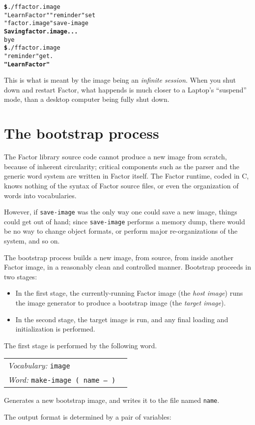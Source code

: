 \documentclass{book}
\newcommand{\vocabulary}[1]{\emph{Vocabulary:} \texttt{#1}&\\}
\newcommand{\ordinaryword}[2]{\index{\texttt{#1}}\emph{Word:} \texttt{#2}&\\}
\newcommand{\wordtable}[1]{


\begin{tabularx}{12cm}{lX}
\hline
#1
\hline
\end{tabularx}

}
\begin{document}
\begin{alltt}
\textbf{\$} ./f factor.image
  "Learn Factor" "reminder" set
  "factor.image" save-image
\textbf{Saving factor.image...}
  bye
\textbf{\$} ./f factor.image
  "reminder" get .
\textbf{"Learn Factor"}
\end{alltt}

This is what is meant by the image being an \emph{infinite session}. When you shut down and restart Factor, what happends is much closer to a Laptop's ``suspend'' mode, than a desktop computer being fully shut down.

\section{The bootstrap process}

The Factor library source code cannot produce a new image from scratch, because
of inherent circularity; critical components such as the parser and the generic
word system are written in Factor itself.
The Factor runtime, coded in C, knows nothing of the syntax of Factor
source files, or even the organization of words into vocabularies.

However, if \verb|save-image| was the only way one could save a new image, things
could get out of hand; since \verb|save-image| performs a memory dump, there would be
no way to change object formats, or perform major re-organizations of the system, and
so on.

The bootstrap process builds a new image, from source, from inside another Factor
image, in a reasonably clean and controlled manner. Bootstrap proceeds in two stages:

\begin{itemize}
\item In the first stage, the currently-running Factor image (the \emph{host image}) runs the image generator to produce a bootstrap image (the \emph{target image}).
\item In the second stage, the target image is run, and any final loading and initialization is performed.
\end{itemize}

The first stage is performed by the following word.

\wordtable{
\vocabulary{image}
\ordinaryword{make-image}{make-image ( name -- )}
}
Generates a new bootstrap image, and writes it to the file named \verb|name|.

The output format is determined by a pair of variables:
\end{document}
